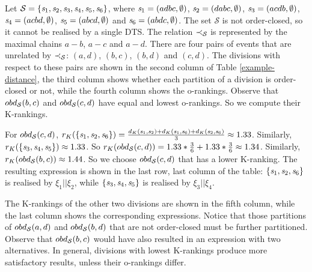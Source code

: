 \begin{example}
\label{ex-paper-table}
Let $\mathcal{S}=\{\mathit{s}_1,\mathit{s}_2,\mathit{s}_3,\mathit{s}_4,\mathit{s}_5,\mathit{s}_6\}$,
where
$\mathit{s}_1=(adbc,\emptyset)$,
$\mathit{s}_2=(dabc,\emptyset)$,
$\mathit{s}_3=(acdb,\emptyset)$,
$\mathit{s}_4=(acbd,\emptyset)$,
$\mathit{s}_5=(abcd,\emptyset)$ and
$\mathit{s}_6=(abdc,\emptyset)$.
The set $\mathcal{S}$ is not order-closed, so it cannot be realised by
a single DTS.
The relation $\prec_{\mathcal{S}}$
is represented by the maximal chains $a-b$, $a-c$ and $a-d$.
There are four pairs of events that are unrelated by
$\prec_{\mathcal{S}}$: $(a,d)$, $(b,c)$,
$(b,d)$ and $(c,d)$. The divisions with respect to these pairs are shown in
the second column of Table \ref{example-distance}, the third
column shows whether each partition of a division is order-closed or
not, while the fourth column shows the o-rankings. Observe that ${obd}_{\mathcal{S}}(b,c)$ and
${obd}_{\mathcal{S}}(c,d)$ have equal and lowest o-rankings. So we compute their K-rankings.

\noindent
For ${obd}_{\mathcal{S}}(c,d)$,
$r_K(\{\mathit{s}_1,\mathit{s}_2,\mathit{s}_6\})=\frac{d_K(\mathit{s}_1,\mathit{s}_2)+d_K(\mathit{s}_1,\mathit{s}_6)+d_K(\mathit{s}_2,\mathit{s}_6)}{3}\approx
1.33$.
Similarly, $r_K(\{\mathit{s}_3,\mathit{s}_4,\mathit{s}_5\})\approx
1.33$.
So
$r_K({obd}_{\mathcal{S}}(c,d))=1.33*\frac{3}{6}+1.33*\frac{3}{6}\approx 1.34$.
Similarly, $r_K({obd}_{\mathcal{S}}(b,c))\approx 1.44$.
So we choose ${obd}_{\mathcal{S}}(c,d)$ that has a lower K-ranking.
The resulting expression is shown in the last row,
last column of the table:
$\{\mathit{s}_1,\mathit{s}_2,\mathit{s}_6\}$ is realised by $\xi_1||\xi_2$,
while $\{\mathit{s}_3,\mathit{s}_4,\mathit{s}_5\}$ is realised by $\xi_3||\xi_4$.

The K-rankings of the other two divisions are shown in
the fifth column, while the last column shows the corresponding
expressions.
Notice that those partitions of ${obd}_{\mathcal{S}}(a,d)$ and
${obd}_{\mathcal{S}}(b,d)$
that are not order-closed must be further partitioned.
Observe that ${obd}_{\mathcal{S}}(b,c)$ would have also resulted in
an expression with two alternatives. In general, divisions with
lowest K-rankings produce more satisfactory results, unless their
o-rankings differ.
\end{example}
